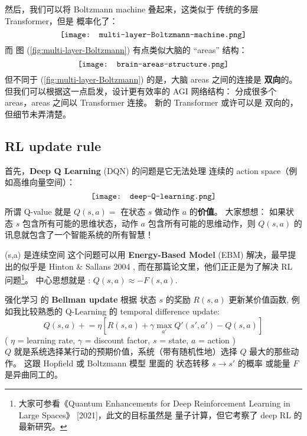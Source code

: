 \begin{preview}
\begin{minipage}{\textwidth}
然后，我们可以将 Boltzmann machine 叠起来，这类似于 传统的多层 Transformer，但是 概率化了：
\begin{equation}
\vcenter{\hbox{\texttt{[image: multi-layer-Boltzmann-machine.png]}}}
\label{fig:multi-layer-Boltzmann}
\end{equation}
而 图 (\ref{fig:multi-layer-Boltzmann}) 有点类似大脑的 ``areas'' 结构：
\begin{equation}
\vcenter{\hbox{\texttt{[image: brain-areas-structure.png]}}}
\end{equation}
但不同于 (\ref{fig:multi-layer-Boltzmann}) 的是，大脑 areas 之间的连接是 \textbf{双向}的。 但我们可以根据这一点启发，设计更有效率的 AGI 网络结构： 分成很多个 areas，areas 之间以 Transformer 连接。 新的 Transformer 或许可以是 双向的，但细节未弄清楚。

\subsection{RL update rule}

首先，\textbf{Deep Q Learning} (DQN) 的问题是它无法处理 连续的 action space（例如高维向量空间）：
\begin{equation}
\vcenter{\hbox{\texttt{[image: deep-Q-learning.png]}}}
\label{fig:DQN}
\end{equation}
所谓 Q-value 就是 $Q(s,a) =$ 在状态 $s$ 做动作 $a$ 的\textbf{价值}。 大家想想： 如果状态 $s$ 包含所有可能的思维状态，动作 $a$ 包含所有可能的思维动作，则 $Q(s,a)$ 的讯息就包含了一个智能系统的所有智慧！

(s,a) 是连续空间 这个问题可以用 \textbf{Energy-Based Model} (EBM) 解决，最早提出的似乎是 Hinton \& Sallans 2004 \cite{Sallans2004}, 而在那篇论文里，他们正正是为了解决 RL 问题\footnote{大家可参看《Quantum Enhancements for Deep Reinforcement Learning in Large Spaces》 [2021]，此文的目标虽然是 量子计算，但它考察了 deep RL 的最新研究。}。 中心思想就是 : $ Q(s,a) \approx -F(s,a) $.

强化学习 的 \textbf{Bellman update} 根据 状态 $s$ 的奖励 $R(s,a)$ 更新某价值函数, 例如我比较熟悉的 Q-Learning 的 temporal difference update:
\begin{equation}
Q(s,a) \mathrel{+}= \eta \left[ R(s,a) + \gamma \max_{a'} Q'(s',a') - Q(s,a) \right]
\end{equation}
( $\eta$ = learning rate, $\gamma$ = discount factor, $s$ = state, $a$ = action )\\
$Q$ 就是系统选择某行动的预期价值，系统（带有随机性地）选择 $Q$ 最大的那些动作。 这跟 Hopfield 或 Boltzmann 模型 里面的 状态转移 $s \rightarrow s'$ 的概率 或能量 $F$ 是异曲同工的。 


\end{minipage}
\end{preview}
